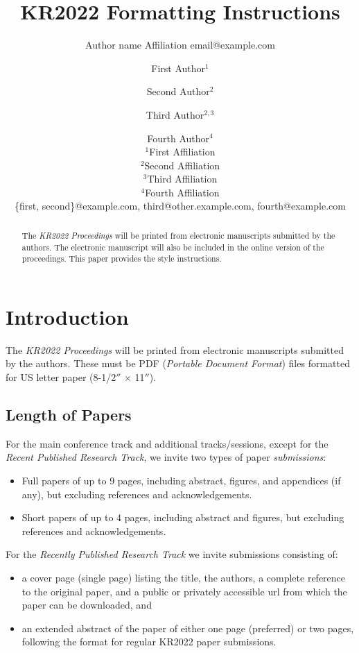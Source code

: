 \documentclass{article}
\title{KR2022 Formatting Instructions}
\author{%
    Author name
    \affiliations
    Affiliation
    \emails
    email@example.com    %
}
\author{%
First Author$^1$\and
Second Author$^2$\and
Third Author$^{2,3}$\and
Fourth Author$^4$ \\
\affiliations
$^1$First Affiliation\\
$^2$Second Affiliation\\
$^3$Third Affiliation\\
$^4$Fourth Affiliation \\
\emails
\{first, second\}@example.com,
third@other.example.com,
fourth@example.com
}
\begin{document}
\maketitle

\begin{abstract}
  The \textit{KR2022 Proceedings} will be printed from electronic
  manuscripts submitted by the authors. The electronic man\-u\-script will
  also be included in the online version of the proceedings. This paper
  provides the style instructions.
\end{abstract}

\section{Introduction}

The \textit{KR2022 Proceedings} will be printed from electronic
manuscripts submitted by the authors. These must be PDF (\emph{Portable
Document Format}) files formatted for US letter paper (8-1/2$''$ $\times$ 11$''$).

\subsection{Length of Papers}

For the main conference track and additional tracks/sessions, except for the
\emph{Recent Published Research Track}, we invite two types of paper
\emph{submissions}:
\begin{itemize}
\item Full papers of up to 9 pages, including abstract, figures, and appendices
  (if any), but excluding references and acknowledgements.
\item Short papers of up to 4 pages, including abstract and figures, but excluding
 references and acknowledgements.
\end{itemize}

For the \emph{Recently Published Research Track} we invite submissions consisting
of:
\begin{itemize}
\item a cover page (single page) listing the title, the authors, a complete
  reference to the original paper, and a public or privately accessible url
  from which the paper can be downloaded, and
\item an extended abstract of the paper of either one page (preferred) or two
  pages, following the format for regular KR2022 paper submissions.
\end{itemize}
\end{document}
